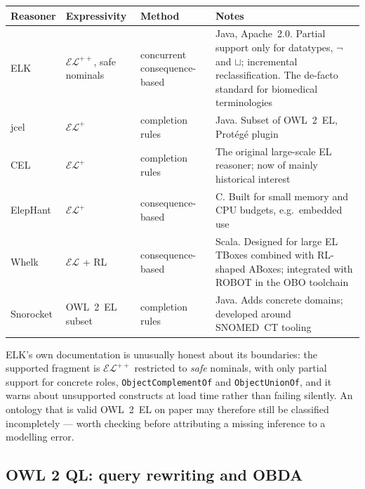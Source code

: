 \documentclass[11pt,a4paper]{article}
\newcommand{\dl}[1]{\ensuremath{\mathcal{#1}}}
\newcommand{\EL}{\dl{EL}}
\begin{document}
\begin{table}[h]
\centering
\footnotesize
\begin{tabular}{@{}lllp{4.5cm}@{}}
\toprule
\textbf{Reasoner} & \textbf{Expressivity} & \textbf{Method} & \textbf{Notes}\\
\midrule
ELK & $\EL^{++}$, safe nominals & concurrent consequence-based
  & Java, Apache~2.0. Partial support only for datatypes, $\neg$ and $\sqcup$;
    incremental reclassification. The de-facto standard for biomedical
    terminologies\\
jcel & $\EL^{+}$ & completion rules
  & Java. Subset of OWL~2~EL, Prot\'eg\'e plugin\\
CEL & $\EL^{+}$ & completion rules
  & The original large-scale EL reasoner; now of mainly historical interest\\
ElepHant & $\EL^{+}$ & consequence-based
  & C. Built for small memory and CPU budgets, e.g.\ embedded use\\
Whelk & $\EL$ + RL & consequence-based
  & Scala. Designed for large EL TBoxes combined with RL-shaped ABoxes;
    integrated with ROBOT in the OBO toolchain\\
Snorocket & OWL~2~EL subset & completion rules
  & Java. Adds concrete domains; developed around SNOMED~CT tooling\\
\bottomrule
\end{tabular}
\end{table}

\noindent
ELK's own documentation is unusually honest about its boundaries: the supported
fragment is $\EL^{++}$ restricted to \emph{safe} nominals, with only partial
support for concrete roles, \texttt{Object\-Complement\-Of} and
\texttt{Object\-Union\-Of}, and it warns about unsupported constructs at load time
rather than failing silently. An ontology that is valid OWL~2~EL on paper may
therefore still be classified incompletely --- worth checking before attributing
a missing inference to a modelling error.

\subsection*{OWL 2 QL: query rewriting and OBDA}
\end{document}
